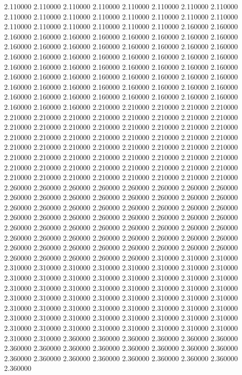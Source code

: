 2.110000
2.110000
2.110000
2.110000
2.110000
2.110000
2.110000
2.110000
2.110000
2.110000
2.110000
2.110000
2.110000
2.110000
2.110000
2.110000
2.110000
2.110000
2.110000
2.110000
2.110000
2.110000
2.160000
2.160000
2.160000
2.160000
2.160000
2.160000
2.160000
2.160000
2.160000
2.160000
2.160000
2.160000
2.160000
2.160000
2.160000
2.160000
2.160000
2.160000
2.160000
2.160000
2.160000
2.160000
2.160000
2.160000
2.160000
2.160000
2.160000
2.160000
2.160000
2.160000
2.160000
2.160000
2.160000
2.160000
2.160000
2.160000
2.160000
2.160000
2.160000
2.160000
2.160000
2.160000
2.160000
2.160000
2.160000
2.160000
2.160000
2.160000
2.160000
2.160000
2.160000
2.160000
2.160000
2.160000
2.160000
2.160000
2.160000
2.160000
2.160000
2.160000
2.160000
2.210000
2.210000
2.210000
2.210000
2.210000
2.210000
2.210000
2.210000
2.210000
2.210000
2.210000
2.210000
2.210000
2.210000
2.210000
2.210000
2.210000
2.210000
2.210000
2.210000
2.210000
2.210000
2.210000
2.210000
2.210000
2.210000
2.210000
2.210000
2.210000
2.210000
2.210000
2.210000
2.210000
2.210000
2.210000
2.210000
2.210000
2.210000
2.210000
2.210000
2.210000
2.210000
2.210000
2.210000
2.210000
2.210000
2.210000
2.210000
2.210000
2.210000
2.210000
2.210000
2.210000
2.210000
2.210000
2.210000
2.210000
2.210000
2.210000
2.210000
2.210000
2.260000
2.260000
2.260000
2.260000
2.260000
2.260000
2.260000
2.260000
2.260000
2.260000
2.260000
2.260000
2.260000
2.260000
2.260000
2.260000
2.260000
2.260000
2.260000
2.260000
2.260000
2.260000
2.260000
2.260000
2.260000
2.260000
2.260000
2.260000
2.260000
2.260000
2.260000
2.260000
2.260000
2.260000
2.260000
2.260000
2.260000
2.260000
2.260000
2.260000
2.260000
2.260000
2.260000
2.260000
2.260000
2.260000
2.260000
2.260000
2.260000
2.260000
2.260000
2.260000
2.260000
2.260000
2.260000
2.260000
2.260000
2.260000
2.260000
2.260000
2.260000
2.310000
2.310000
2.310000
2.310000
2.310000
2.310000
2.310000
2.310000
2.310000
2.310000
2.310000
2.310000
2.310000
2.310000
2.310000
2.310000
2.310000
2.310000
2.310000
2.310000
2.310000
2.310000
2.310000
2.310000
2.310000
2.310000
2.310000
2.310000
2.310000
2.310000
2.310000
2.310000
2.310000
2.310000
2.310000
2.310000
2.310000
2.310000
2.310000
2.310000
2.310000
2.310000
2.310000
2.310000
2.310000
2.310000
2.310000
2.310000
2.310000
2.310000
2.310000
2.310000
2.310000
2.310000
2.310000
2.310000
2.310000
2.310000
2.310000
2.310000
2.310000
2.360000
2.360000
2.360000
2.360000
2.360000
2.360000
2.360000
2.360000
2.360000
2.360000
2.360000
2.360000
2.360000
2.360000
2.360000
2.360000
2.360000
2.360000
2.360000
2.360000
2.360000
2.360000
2.360000
